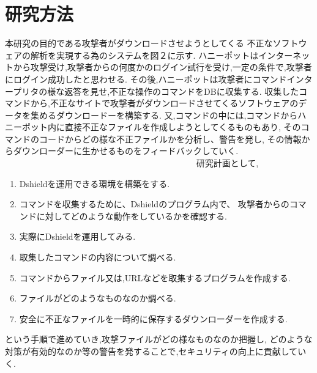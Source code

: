 \documentclass{entry}
\begin{document}
\section{研究方法}
本研究の目的である攻撃者がダウンロードさせようとしてくる
不正なソフトウェアの解析を実現する為のシステムを図２に示す.                   
ハニーポットはインターネットから攻撃受け,攻撃者からの何度かのログイン試行を受け,一定の条件で,攻撃者にログイン成功したと思わせる.
その後,ハニーポットは攻撃者にコマンドインタープリタの様な返答を見せ,不正な操作のコマンドをDBに収集する.
収集したコマンドから,不正なサイトで攻撃者がダウンロードさせてくるソフトウェアのデータを集めるダウンロードーを構築する.
又,コマンドの中には,コマンドからハニーポット内に直接不正なファイルを作成しようとしてくるものもあり,
そのコマンドのコードからどの様な不正ファイルかを分析し、警告を発し,
その情報からダウンローダーに生かせるものをフィードバックしていく.
　　　　　　　　　　　　　　　　　　　　　　
研究計画として,
\begin{enumerate}
    \item Dshieldを運用できる環境を構築をする.
    \item コマンドを収集するために、Dshieldのプログラム内で、
	攻撃者からのコマンドに対してどのような動作をしているかを確認する.
    \item 実際にDshieldを運用してみる.
    \item 取集したコマンドの内容について調べる.
    \item コマンドからファイル又は,URLなどを取集するプログラムを作成する.
    \item ファイルがどのようなものなのか調べる.
    \item 安全に不正なファイルを一時的に保存するダウンローダーを作成する.
\end{enumerate}
という手順で進めていき,攻撃ファイルがどの様なものなのか把握し,
どのような対策が有効的なのか等の警告を発することで,セキュリティの向上に貢献していく.
\end{document}
